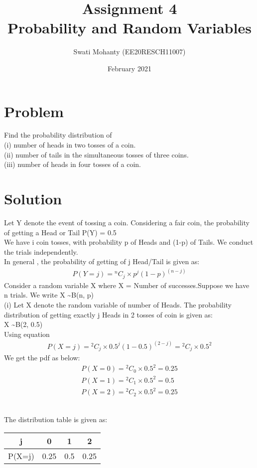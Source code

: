 \documentclass[journal,12pt,twocolumn]{IEEEtran}
\title{Assignment 4
\\Probability and Random Variables }
\author{Swati Mohanty (EE20RESCH11007) }
\date{February 2021}
\newcommand*{\Comb}[2]{{}^{#1}C_{#2}}%
\begin{document}
\maketitle


\section{Problem}
Find the probability distribution of
\\(i) number of heads in two tosses of a coin.
\\(ii) number of tails in the simultaneous tosses
of three coins.
\\(iii) number of heads in four tosses of a coin.

\section{Solution}
Let Y denote the event of tossing a coin. Considering a fair coin, the probability of getting a Head or Tail P(Y) = 0.5
\\We have i coin tosses, with probability p of Heads and (1-p) of Tails. We
conduct the trials independently. 
\\In general , the probability of getting of j Head/Tail is given as:
\begin{align}
    P(Y = j) = \Comb{n}{j}\times { p^j (1-p)^{(n-j)}} 
\end{align}
Consider a random variable X where X = Number of successes.Suppose we have n trials. We write
X \textasciitilde B(n, p) 
\\(i)
Let X denote the random variable of number of Heads.
The probability distribution of getting exactly j Heads in 2 tosses of coin is given as:
\\X \textasciitilde B(2, 0.5) 
\\Using equation 
\begin{align}
    P(X = j) = \Comb{2}{j}\times { 0.5^j (1-0.5)^{(2-j)}} =\Comb{2}{j}\times { 0.5^2}
\end{align}
We get the pdf as below:
\begin{align}
    P(X=0) =\Comb{2}{0}\times { 0.5^2}
    =0.25
    \\P(X=1) = \Comb{2}{1}\times { 0.5^2} = 0.5
    \\P(X=2) = \Comb{2}{2}\times { 0.5^2} = 0.25
\end{align}

\\The distribution table is given as:
\begin{center}
\begin{tabular}{ |c|c|c|c| } 
 \hline
 j & 0 & 1 & 2 \\\hline 
 P(X=j) & 0.25 &0.5 & 0.25 \\ 
 \hline
\end{tabular}
\end{center}
\end{document}
